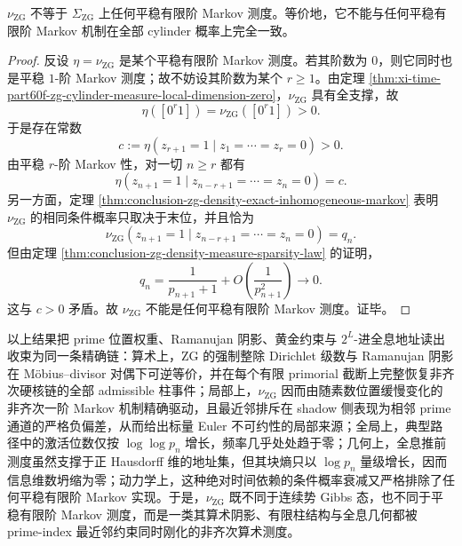 \begin{corollary}\label{cor:conclusion-zg-density-not-stationary-finite-order-markov}
\(\nu_{\mathrm{ZG}}\) 不等于 \(\Sigma_{\mathrm{ZG}}\) 上任何平稳有限阶 Markov 测度。等价地，它不能与任何平稳有限阶 Markov 机制在全部 cylinder 概率上完全一致。
\end{corollary}
\begin{proof}
反设 \(\eta=\nu_{\mathrm{ZG}}\) 是某个平稳有限阶 Markov 测度。若其阶数为 \(0\)，则它同时也是平稳 \(1\)-阶 Markov 测度；故不妨设其阶数为某个 \(r\ge 1\)。由定理 \ref{thm:xi-time-part60f-zg-cylinder-measure-local-dimension-zero}，\(\nu_{\mathrm{ZG}}\) 具有全支撑，故
\[
\eta([0^r1])=\nu_{\mathrm{ZG}}([0^r1])>0.
\]
于是存在常数
\[
c:=\eta(z_{r+1}=1\mid z_1=\cdots=z_r=0)>0.
\]
由平稳 \(r\)-阶 Markov 性，对一切 \(n\ge r\) 都有
\[
\eta(z_{n+1}=1\mid z_{n-r+1}=\cdots=z_n=0)=c.
\]
另一方面，定理 \ref{thm:conclusion-zg-density-exact-inhomogeneous-markov} 表明 \(\nu_{\mathrm{ZG}}\) 的相同条件概率只取决于末位，并且恰为
\[
\nu_{\mathrm{ZG}}(z_{n+1}=1\mid z_{n-r+1}=\cdots=z_n=0)=q_n.
\]
但由定理 \ref{thm:conclusion-zg-density-measure-sparsity-law} 的证明，
\[
q_n=\frac{1}{p_{n+1}+1}+O\!\left(\frac1{p_{n+1}^2}\right)\longrightarrow 0.
\]
这与 \(c>0\) 矛盾。故 \(\nu_{\mathrm{ZG}}\) 不能是任何平稳有限阶 Markov 测度。证毕。
\end{proof}

以上结果把 prime 位置权重、Ramanujan 阴影、黄金约束与 \(2^L\)-进全息地址读出收束为同一条精确链：算术上，\(\mathrm{ZG}\) 的强制整除 Dirichlet 级数与 Ramanujan 阴影在 Möbius--divisor 对偶下可逆等价，并在每个有限 primorial 截断上完整恢复非齐次硬核链的全部 admissible 柱事件；局部上，\(\nu_{\mathrm{ZG}}\) 因而由随素数位置缓慢变化的非齐次一阶 Markov 机制精确驱动，且最近邻排斥在 shadow 侧表现为相邻 prime 通道的严格负偏差，从而给出标量 Euler 不可约性的局部来源；全局上，典型路径中的激活位数仅按 \(\log\log p_n\) 增长，频率几乎处处趋于零；几何上，全息推前测度虽然支撑于正 Hausdorff 维的地址集，但其块熵只以 \(\log p_n\) 量级增长，因而信息维数坍缩为零；动力学上，这种绝对时间依赖的条件概率衰减又严格排除了任何平稳有限阶 Markov 实现。于是，\(\nu_{\mathrm{ZG}}\) 既不同于连续势 Gibbs 态，也不同于平稳有限阶 Markov 测度，而是一类其算术阴影、有限柱结构与全息几何都被 prime-index 最近邻约束同时刚化的非齐次算术测度。

\endinput
